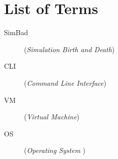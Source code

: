 \chapter*{List of Terms}\mbox{}
\label{sec:skroty}
\noindent
\begin{description}
  \item [SimBad] (\emph{Simulation Birth and Death})
  \item [CLI] (\emph{Command Line Interface})
  \item [VM] (\emph{Virtual Machine})
  \item [OS] (\emph{Operating System })
\end{description}
